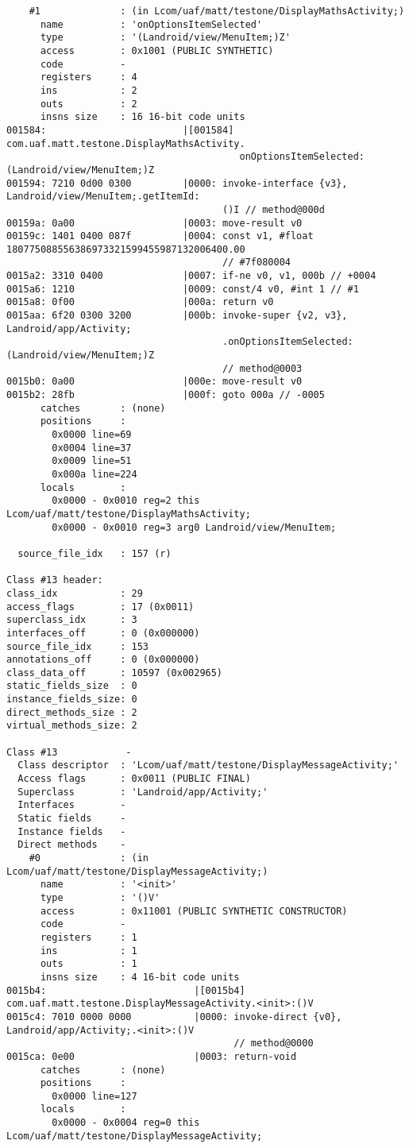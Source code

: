 \begin{lstlisting}
    #1              : (in Lcom/uaf/matt/testone/DisplayMathsActivity;)
      name          : 'onOptionsItemSelected'
      type          : '(Landroid/view/MenuItem;)Z'
      access        : 0x1001 (PUBLIC SYNTHETIC)
      code          -
      registers     : 4
      ins           : 2
      outs          : 2
      insns size    : 16 16-bit code units
001584:                        |[001584] com.uaf.matt.testone.DisplayMathsActivity.
                                         onOptionsItemSelected:(Landroid/view/MenuItem;)Z
001594: 7210 0d00 0300         |0000: invoke-interface {v3}, Landroid/view/MenuItem;.getItemId:
                                      ()I // method@000d
00159a: 0a00                   |0003: move-result v0
00159c: 1401 0400 087f         |0004: const v1, #float 180775088556386973321599455987132006400.00
                                      // #7f080004
0015a2: 3310 0400              |0007: if-ne v0, v1, 000b // +0004
0015a6: 1210                   |0009: const/4 v0, #int 1 // #1
0015a8: 0f00                   |000a: return v0
0015aa: 6f20 0300 3200         |000b: invoke-super {v2, v3}, Landroid/app/Activity;
                                      .onOptionsItemSelected:(Landroid/view/MenuItem;)Z
                                      // method@0003
0015b0: 0a00                   |000e: move-result v0
0015b2: 28fb                   |000f: goto 000a // -0005
      catches       : (none)
      positions     :
        0x0000 line=69
        0x0004 line=37
        0x0009 line=51
        0x000a line=224
      locals        :
        0x0000 - 0x0010 reg=2 this Lcom/uaf/matt/testone/DisplayMathsActivity;
        0x0000 - 0x0010 reg=3 arg0 Landroid/view/MenuItem;

  source_file_idx   : 157 (r)

Class #13 header:
class_idx           : 29
access_flags        : 17 (0x0011)
superclass_idx      : 3
interfaces_off      : 0 (0x000000)
source_file_idx     : 153
annotations_off     : 0 (0x000000)
class_data_off      : 10597 (0x002965)
static_fields_size  : 0
instance_fields_size: 0
direct_methods_size : 2
virtual_methods_size: 2

Class #13            -
  Class descriptor  : 'Lcom/uaf/matt/testone/DisplayMessageActivity;'
  Access flags      : 0x0011 (PUBLIC FINAL)
  Superclass        : 'Landroid/app/Activity;'
  Interfaces        -
  Static fields     -
  Instance fields   -
  Direct methods    -
    #0              : (in Lcom/uaf/matt/testone/DisplayMessageActivity;)
      name          : '<init>'
      type          : '()V'
      access        : 0x11001 (PUBLIC SYNTHETIC CONSTRUCTOR)
      code          -
      registers     : 1
      ins           : 1
      outs          : 1
      insns size    : 4 16-bit code units
0015b4:                          |[0015b4] com.uaf.matt.testone.DisplayMessageActivity.<init>:()V
0015c4: 7010 0000 0000           |0000: invoke-direct {v0}, Landroid/app/Activity;.<init>:()V
                                        // method@0000
0015ca: 0e00                     |0003: return-void
      catches       : (none)
      positions     :
        0x0000 line=127
      locals        :
        0x0000 - 0x0004 reg=0 this Lcom/uaf/matt/testone/DisplayMessageActivity;


\end{lstlisting}
